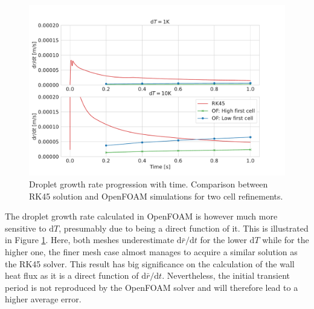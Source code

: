 \documentclass[12pt]{article}
\numberwithin{equation}{section}
\begin{document}
\begin{figure}[H]
    \centering
    \includegraphics[trim={0 20 0 50},clip,width=1\textwidth]{Figures/drdt_OF.pdf}
    \caption{Droplet growth rate progression with time. Comparison between RK45 solution and OpenFOAM simulations for two cell refinements.}
    \label{f:drdt_OF}
\end{figure}
The droplet growth rate calculated in OpenFOAM is however much more sensitive to $\mathrm{d}T$, presumably due to being a direct function of it. This is illustrated in Figure \ref{f:drdt_OF}. Here, both meshes underestimate $\mathrm{d}\bar{r}/\mathrm{d}t$ for the lower $\mathrm{d}T$ while for the higher one, the finer mesh case almost manages to acquire a similar solution as the RK45 solver. This result has big significance on the calculation of the wall heat flux as it is a direct function of $\mathrm{d}\bar{r}/\mathrm{d}t$. Nevertheless, the initial transient period is not reproduced by the OpenFOAM solver and will therefore lead to a higher average error. 
\end{document}
